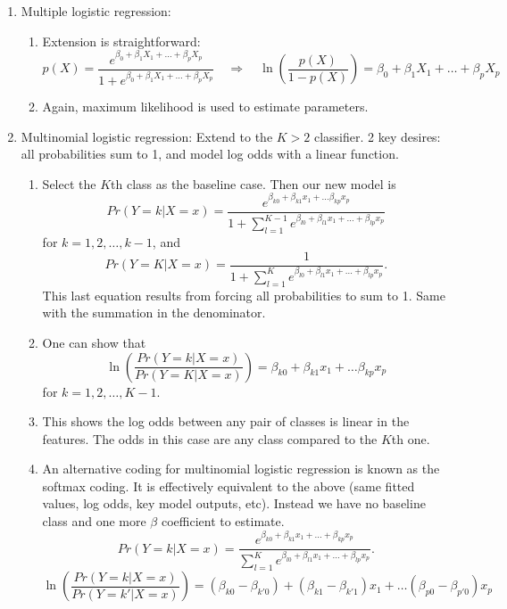 \documentclass{article}
\begin{document}
\begin{enumerate}
\begin{enumerate}
    \item \textbf{Nonlinear boundaries:} To obtain nonlinear decision boundaries, one can transform predictors before modeling, e.g., include $X^2$, interactions $X_1 X_2$, or use splines.
\end{enumerate}

\item Multiple logistic regression:
\begin{enumerate}
\item Extension is straightforward:
\[
p(X) = \frac{e^{\beta_0 + \beta_1 X_1 + \dots + \beta_p X_p}}{1+e^{\beta_0 + \beta_1 X_1 + \dots + \beta_p X_p}} \quad \Rightarrow \quad \ln\left( \frac{p(X)}{1-p(X)} \right) = \beta_0 + \beta_1 X_1 + \dots + \beta_p X_p
\]
\item Again, maximum likelihood is used to estimate parameters.
\end{enumerate}

\item Multinomial logistic regression: Extend to the $K>2$ classifier. 2 key desires: all probabilities sum to 1, and model log odds with a linear function.
\begin{enumerate}
\item Select the $K$th class as the baseline case. Then our new model is
\[
Pr(Y=k | X=x) = \frac{e^{\beta_{k0} + \beta_{k1} x_1 + \dots \beta_{kp}x_p}}{1+ \sum_{l=1}^{K-1} e^{\beta_{l0}+\beta_{l1}x_1 + \dots + \beta_{lp}x_p}}
\]
for $k=1,2,\dots,k-1$, and
\[
Pr(Y=K | X=x) = \frac{1}{1+ \sum_{l=1}^{K} e^{\beta_{l0}+\beta_{l1}x_1 + \dots + \beta_{lp}x_p}}.
\]
This last equation results from forcing all probabilities to sum to 1. Same with the summation in the denominator.
\item One can show that
\[
\ln \left(\frac{Pr(Y=k|X=x)}{Pr(Y=K|X=x)} \right) = \beta_{k0} + \beta_{k1} x_1 + \dots \beta_{kp}x_p
\]
for $k=1,2, \dots, K-1$.
\item This shows the log odds between any pair of classes is linear in the features. The odds in this case are any class compared to the $K$th one.
\item An alternative coding for multinomial logistic regression is known as the softmax coding. It is effectively equivalent to the above (same fitted values, log odds, key model outputs, etc). Instead we have no baseline class and one more $\beta$ coefficient to estimate.
\[
Pr(Y=k | X=x) = \frac{e^{\beta_{k0}+\beta_{k1}x_1 + \dots + \beta_{kp}x_p}}{\sum_{l=1}^{K} e^{\beta_{l0}+\beta_{l1}x_1 + \dots + \beta_{lp}x_p}}.
\]
\[
\ln \left(\frac{Pr(Y=k|X=x)}{Pr(Y=k'|X=x)} \right) = (\beta_{k0}-\beta_{k'0}) + (\beta_{k1}-\beta_{k'1}) x_1 + \dots (\beta_{p0}-\beta_{p'0})x_p
\]

\end{enumerate}
\end{enumerate}
\end{document}
